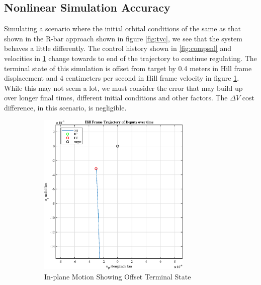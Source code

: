 \documentclass[conf]{new-aiaa}
\begin{document}
\begin{singlespace}
\subsection{Nonlinear Simulation Accuracy}
Simulating a scenario where the initial orbital conditions of the same as that shown in the R-bar approach shown in figure \ref{fig:tvc}, we see that the system behaves a little differently. The control history shown in \ref{fig:compsnl} and velocities in \ref{fig:offset} change towards to end of the trajectory to continue regulating. The terminal state of this simulation is offset from target by 0.4 meters in Hill frame displacement and 4 centimeters per second in Hill frame velocity in figure \ref{fig:offset}. While this may not seem a lot, we must consider the error that may build up over longer final times, different initial conditions and other factors. The $\Delta V$ cost difference, in this scenario, is negligible.
\begin{figure}[htpb!]
\begin{subfigure}{.5\textwidth}
  \centering
  \includegraphics[width=0.8\textwidth]{figures/nlt3.eps}
  \caption{In-plane Motion Showing Offset Terminal State}
  \label{fig:offset}
\end{subfigure}%
\begin{subfigure}{.5\textwidth}
  \centering

\end{subfigure}
\end{figure}
\end{singlespace}
\end{document}
